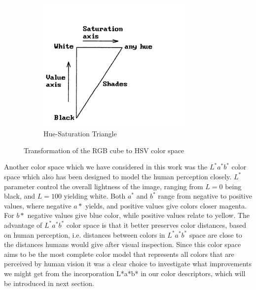 \documentclass{report}
\begin{document}
\begin{figure}[hbtp]
\begin{subfigure}[b]{0.3\textwidth}
                \label{fig:mouse}
        \end{subfigure}
        ~
        \begin{subfigure}[b]{0.3\textwidth}
                \includegraphics[width=\textwidth]{graphics/hsv_rescale2.png}
                \caption{Hue-Saturation Triangle}
                \label{fig:tiger}
        \end{subfigure}
        \caption{Transformation of the RGB cube to HSV color space}\label{fig:hsv_visualisation}
\end{figure}



Another color space which we have considered in this work was the $L^*a^*b^*$ color space which also has been designed to model the human perception closely. $L^*$ parameter control the overall lightness of the image, ranging from $L=0$ being black, and $L=100$ yielding white. Both $a^*$ and $b^*$ range from negative to positive values, where negative $a*$ yields, and positive values give colors closer magenta. For $b*$ negative values give blue color, while positive values relate to yellow. The advantage of $L^*a^*b^*$ color space is that it better preserves color distances, based on human perception, i.e. distances between colors in $L^*a^*b^*$ space are close to the distances humans would give after visual inspection. Since this color space aims to be the most complete color model that represents all colors that are perceived by human vision it was a clear choice to investigate what improvements we might get from the incorporation L*a*b* in our color descriptors, which will be introduced in next section.
\end{document}
